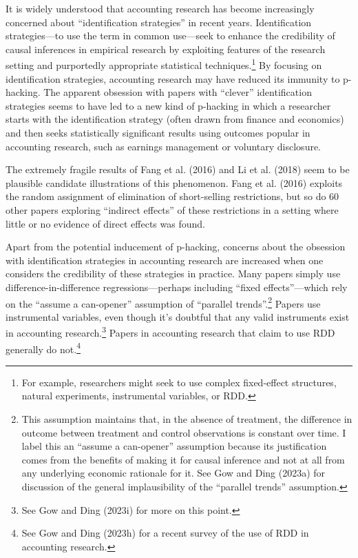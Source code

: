 \documentclass[
  letterpaper,
  DIV=11,
  numbers=noendperiod]{scrartcl}
\begin{document}
It is widely understood that accounting research has become increasingly
concerned about ``identification strategies'' in recent years.
Identification strategies---to use the term in common use---seek to
enhance the credibility of causal inferences in empirical research by
exploiting features of the research setting and purportedly appropriate
statistical techniques.\footnote{For example, researchers might seek to
  use complex fixed-effect structures, natural experiments, instrumental
  variables, or RDD.} By focusing on identification strategies,
accounting research may have reduced its immunity to p-hacking. The
apparent obsession with papers with ``clever'' identification strategies
seems to have led to a new kind of p-hacking in which a researcher
starts with the identification strategy (often drawn from finance and
economics) and then seeks statistically significant results using
outcomes popular in accounting research, such as earnings management or
voluntary disclosure.

The extremely fragile results of Fang et al. (2016) and Li et al. (2018)
seem to be plausible candidate illustrations of this phenomenon. Fang et
al. (2016) exploits the random assignment of elimination of
short-selling restrictions, but so do 60 other papers exploring
``indirect effects'' of these restrictions in a setting where little or
no evidence of direct effects was found.

Apart from the potential inducement of p-hacking, concerns about the
obsession with identification strategies in accounting research are
increased when one considers the credibility of these strategies in
practice. Many papers simply use difference-in-difference
regressions---perhaps including ``fixed effects''---which rely on the
``assume a can-opener'' assumption of ``parallel trends''.\footnote{This
  assumption maintains that, in the absence of treatment, the difference
  in outcome between treatment and control observations is constant over
  time. I label this an ``assume a can-opener'' assumption because its
  justification comes from the benefits of making it for causal
  inference and not at all from any underlying economic rationale for
  it. See Gow and Ding (2023a) for discussion of the general
  implausibility of the ``parallel trends'' assumption.} Papers use
instrumental variables, even though it's doubtful that any valid
instruments exist in accounting research.\footnote{See Gow and Ding
  (2023i) for more on this point.} Papers in accounting research that
claim to use RDD generally do not.\footnote{See Gow and Ding (2023h) for
  a recent survey of the use of RDD in accounting research.}
\end{document}
